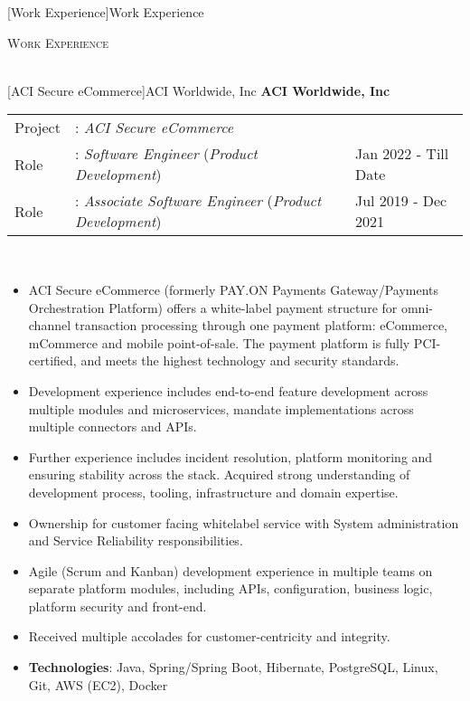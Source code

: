 \documentclass[a4paper]{article}
\newcommand{\lineunder} {
    \vspace*{-8pt} \\
    \hspace*{-18pt} \hrulefill \\
}
\newcommand{\header} [1] {
    {\hspace*{-18pt}\vspace*{6pt} \textsc{#1}}
    \vspace*{-6pt} \lineunder
}
\begin{document}
[Work Experience]{Work Experience}
\header{Work Experience}
\vspace{1mm}

[ACI Secure eCommerce]{ACI Worldwide, Inc}
\textbf{ACI Worldwide, Inc} \\
\noindent
\begin{tabularx}{\textwidth}{ l l>{\raggedleft\arraybackslash}X}
  Project & : \textit{ACI Secure eCommerce} & \\
  Role & : \textit{Software Engineer} (\textit{Product Development})  & Jan 2022 - Till Date \\
  Role & : \textit{Associate Software Engineer} (\textit{Product Development})  & Jul 2019 - Dec 2021 \\
\end{tabularx}
\textbf{} \\
\begin{itemize} \itemsep 1pt
  \item ACI Secure eCommerce (formerly PAY.ON Payments Gateway/Payments Orchestration Platform) offers a white-label payment structure for omni-channel transaction processing through one payment platform: eCommerce, mCommerce and mobile point-of-sale. The payment platform is fully PCI-certified, and meets the highest technology and security standards.
  \item Development experience includes end-to-end feature development across multiple modules and microservices, mandate implementations across multiple connectors and APIs.
  \item Further experience includes incident resolution, platform monitoring and ensuring stability across the stack. Acquired strong understanding of development process, tooling, infrastructure and domain expertise.
  \item Ownership for customer facing whitelabel service with System administration and Service Reliability responsibilities.
  \item Agile (Scrum and Kanban) development experience in multiple teams on separate platform modules, including APIs, configuration, business logic, platform security and front-end.
  \item Received multiple accolades for customer-centricity and integrity.
  \item \textbf{Technologies}: Java, Spring/Spring Boot, Hibernate, PostgreSQL, Linux, Git, AWS (EC2), Docker
\end{itemize}
\end{document}
